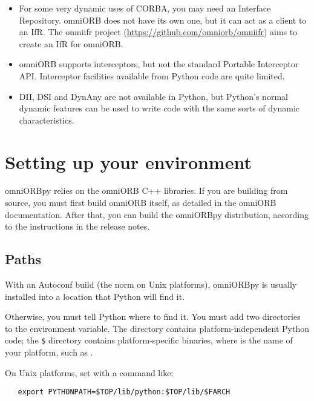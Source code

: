\documentclass[11pt,oneside,a4paper]{book}
\begin{document}
\begin{itemize}

\item For some very dynamic uses of CORBA, you may need an Interface
  Repository. omniORB does not have its own one, but it can act as a
  client to an IfR. The omniifr project
  (\url{https://github.com/omniorb/omniifr}) aims to create an IfR
  for omniORB.

\item omniORB supports interceptors, but not the standard Portable
  Interceptor API. Interceptor facilities available from Python code
  are quite limited.

\item DII, DSI and DynAny are not available in Python, but Python's
  normal dynamic features can be used to write code with the same
  sorts of dynamic characteristics.

\end{itemize}



\section{Setting up your environment}
\label{sec:setup}

omniORBpy relies on the omniORB C++ libraries. If you are building
from source, you must first build omniORB itself, as detailed in the
omniORB documentation. After that, you can build the omniORBpy
distribution, according to the instructions in the release notes.


\subsection{Paths}

With an Autoconf build (the norm on Unix platforms), omniORBpy is
usually installed into a location that Python will find it.

Otherwise, you must tell Python where to find it. You must add two
directories to the  environment variable. The
 directory contains platform-independent Python code;
the \texttt{\$} directory contains
platform-specific binaries, where  is the name of
your platform, such as .

On Unix platforms, set  with a command like:

\begin{verbatim}
   export PYTHONPATH=$TOP/lib/python:$TOP/lib/$FARCH
\end{verbatim}
\end{document}
